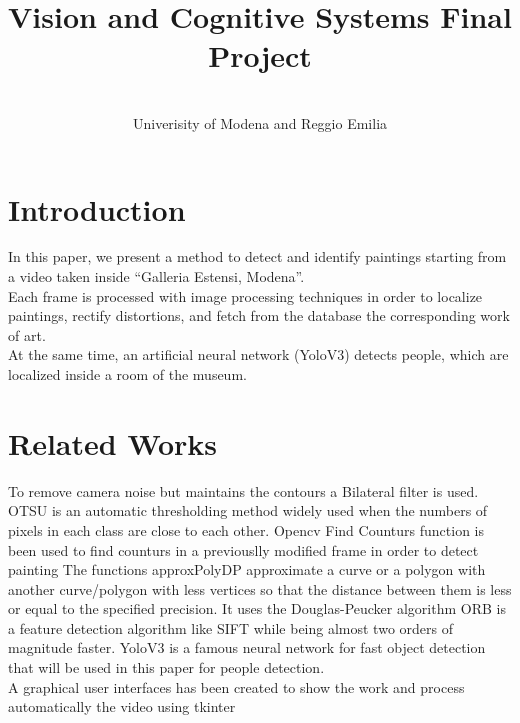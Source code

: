 \documentclass[conference]{IEEEtran}
\begin{document}
\title{Vision and Cognitive Systems Final Project}
\author{
\and
{}
\\
\large{Univerisity of Modena and Reggio Emilia}
\and
{}
}
\maketitle


\section{Introduction}
In this paper, we present a method to detect and identify paintings starting from a video taken inside “Galleria Estensi, Modena”.\\
Each frame is processed with image processing techniques in order to localize paintings, rectify distortions, and fetch from the database the corresponding work of art.\\
At the same time, an artificial neural network (YoloV3) detects people, which are localized inside a room of the museum.\\

\section{Related Works}
To remove camera noise but maintains the contours a  Bilateral filter\cite{b1} is used.
OTSU\cite{b2} is an automatic thresholding method widely used when the numbers of pixels in each class are close to each other.
Opencv Find Counturs\cite{b3} function is been used to find counturs in a previouslly modified frame in order to detect painting
The functions approxPolyDP\cite{b4} approximate a curve or a polygon with another curve/polygon with less vertices so that the distance between them is less or equal to the specified precision. It uses the Douglas-Peucker algorithm  
ORB\cite{b5} is a feature detection algorithm like SIFT while being almost two orders of magnitude faster.
YoloV3 \cite{b5}  is a famous neural network for fast object detection that will be used in this paper for people detection.\\
A graphical user interfaces has been created to show the work and process automatically the video using tkinter \cite{b12}\\
\end{document}
